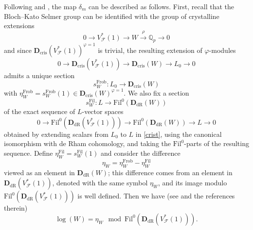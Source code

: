 \documentclass[a4paper,11pt]{amsart}
\numberwithin{equation}{section}
\theoremstyle{plain}
\theoremstyle{definition}
\theoremstyle{remark}
\newcommand{\Q}{\mathbb Q}
\DeclareMathOperator{\Frob}{Frob}
\newcommand{\dR}{\mathrm{dR}}
\begin{document}
Following \cite[\S3.4]{BDP} and \cite[\S2.2]{Castella-MathAnn}, the map $\delta_m$ can be described as follows. First, recall that the Bloch--Kato Selmer group can be identified with the group of crystalline extensions  
\[0\longrightarrow V_\mathcal{F}^*(1)\longrightarrow W\overset{\rho}\longrightarrow \Q_p\longrightarrow 0\]
and since $\mathbf{D}_\mathrm{cris}(V_\mathcal{F}^*(1))^{\varphi=1}$ is trivial,
the resulting extension of $\varphi$-modules 
\begin{equation}\label{crist}
0\longrightarrow \mathbf{D}_\mathrm{cris}(V_\mathcal{F}^*(1))\longrightarrow \mathbf{D}_\mathrm{cris}(W)\longrightarrow L_0\longrightarrow 0\end{equation}
admits a unique section 
\[s_W^{\Frob}\colon L_0\longrightarrow \mathbf{D}_\mathrm{cris}(W)\] with $\eta_W^{\Frob}=s_W^{\Frob}(1)\in  
\mathbf{D}_\mathrm{cris}(W)^{\varphi=1}$. We also fix a section 
\[s_W^\mathrm{Fil}\colon L\longrightarrow \mathrm{Fil}^0(\mathbf{D}_\dR(W))\]
of the exact sequence of $L$-vector spaces 
\begin{equation}\label{dR-Fil}
0\longrightarrow \mathrm{Fil}^0(\mathbf{D}_\dR(V_\mathcal{F}^*(1)))\longrightarrow 
\mathrm{Fil}^0(\mathbf{D}_\dR(W))\longrightarrow L\longrightarrow 0\end{equation}
obtained by extending scalars from $L_0$ to $L$ in \eqref{crist}, using the canonical isomorphism with de Rham cohomology, and 
taking the $\mathrm{Fil}^0$-parts of the resulting sequence. Define $\eta_W^{\mathrm{Fil}}=s_W^\mathrm{Fil}(1)$ and consider the difference \[\eta_W=\eta_W^{\Frob}-\eta_W^{\mathrm{Fil}}\] 
viewed as an element in $\mathbf{D}_\dR(W)$; this difference comes from an element in $\mathbf{D}_\dR(V_\mathcal{F}^*(1))$, denoted with the same symbol $\eta_W$, and its image modulo $\mathrm{Fil}^0(\mathbf{D}_\dR(V_\mathcal{F}^*(1)))$ is well defined. Then we have (see \cite[Lemma 2.4]{Castella-MathAnn} and the references therein) 
\[\log(W)=\eta _W\mod \mathrm{Fil}^0(\mathbf{D}_\dR(V_\mathcal{F}^*(1))).\]
\end{document}
